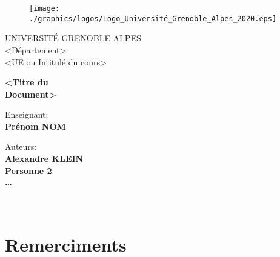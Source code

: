 \documentclass[a4paper, twoside]{report}
\begin{document}





\begin{titlepage}
\begin{figure}[!htb]
    \centering
    \texttt{[image: ./graphics/logos/Logo\_Université\_Grenoble\_Alpes\_2020.eps]}
\end{figure}

\begin{center}
    \LARGE{UNIVERSITÉ GRENOBLE ALPES}
    \vspace{5mm}
    \\ \large{<Département>}
    \vspace{5mm}
    \\ \LARGE{<UE ou Intitulé du cours>}
\end{center}

\vspace{15mm}
\begin{center}
    {\LARGE{\bf <Titre du\\\vspace{5mm}Document>}}
\end{center}
\vspace{30mm}

\begin{minipage}[t]{0.47\textwidth}
	{\large{Enseignant:}{\normalsize\vspace{3mm}
	\bf\\ \large{Prénom NOM \vspace{2mm}\\ }}}
\end{minipage}
\hfill
\begin{minipage}[t]{0.47\textwidth}\raggedleft
	{\large{Auteurs:}{\normalsize\vspace{3mm}
    \bf\\ \large{Alexandre KLEIN \vspace{2mm}\\ Personne 2 \vspace{2mm}\\\ldots }}}
\end{minipage}

\vspace{30mm}
\hrulefill
\\

\end{titlepage}




\chapter*{Remerciments}
\end{document}
